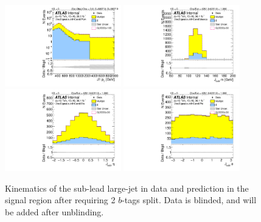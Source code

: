 \begin{figure}[htbp!]
\begin{center}
\includegraphics[width=0.45\textwidth,angle=-90]{figures/boosted/Signal/b77_TwoTag_split_Signal_sublHCand_Pt_m_1_blind.pdf}
\includegraphics[width=0.45\textwidth,angle=-90]{figures/boosted/Signal/b77_TwoTag_split_Signal_sublHCand_Mass_s_blind.pdf}\\
\includegraphics[width=0.45\textwidth,angle=-90]{figures/boosted/Signal/b77_TwoTag_split_Signal_sublHCand_Eta_blind.pdf}
\includegraphics[width=0.45\textwidth,angle=-90]{figures/boosted/Signal/b77_TwoTag_split_Signal_sublHCand_Phi_blind.pdf}
  \caption{Kinematics of the sub-lead large-\R jet in data and prediction in the signal region after requiring 2 $b$-tags split. Data is blinded, and will be added after unblinding.}
  \label{fig:boosted-2bs-signal-blind-ak10-subl}
\end{center}
\end{figure}

